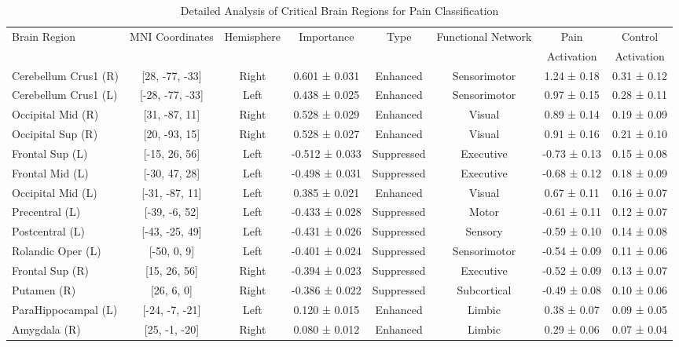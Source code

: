 \documentclass[10pt,journal,compsoc]{IEEEtran}
\begin{document}
\begin{table}[htbp]
\caption{Detailed Analysis of Critical Brain Regions for Pain Classification}
\label{tab:detailed_brain_regions}
\centering
\small
\begin{tabular}{lccccccc}
\toprule
\multirow{2}{*}{Brain Region} & \multirow{2}{*}{MNI Coordinates} & \multirow{2}{*}{Hemisphere} & \multirow{2}{*}{Importance} & \multirow{2}{*}{Type} & \multirow{2}{*}{Functional Network} & Pain & Control \\
& & & & & & Activation & Activation \\
\midrule
Cerebellum Crus1 (R) & [28, -77, -33] & Right & 0.601 ± 0.031 & Enhanced & Sensorimotor & 1.24 ± 0.18 & 0.31 ± 0.12 \\
Cerebellum Crus1 (L) & [-28, -77, -33] & Left & 0.438 ± 0.025 & Enhanced & Sensorimotor & 0.97 ± 0.15 & 0.28 ± 0.11 \\
Occipital Mid (R) & [31, -87, 11] & Right & 0.528 ± 0.029 & Enhanced & Visual & 0.89 ± 0.14 & 0.19 ± 0.09 \\
Occipital Sup (R) & [20, -93, 15] & Right & 0.528 ± 0.027 & Enhanced & Visual & 0.91 ± 0.16 & 0.21 ± 0.10 \\
Frontal Sup (L) & [-15, 26, 56] & Left & -0.512 ± 0.033 & Suppressed & Executive & -0.73 ± 0.13 & 0.15 ± 0.08 \\
Frontal Mid (L) & [-30, 47, 28] & Left & -0.498 ± 0.031 & Suppressed & Executive & -0.68 ± 0.12 & 0.18 ± 0.09 \\
Occipital Mid (L) & [-31, -87, 11] & Left & 0.385 ± 0.021 & Enhanced & Visual & 0.67 ± 0.11 & 0.16 ± 0.07 \\
Precentral (L) & [-39, -6, 52] & Left & -0.433 ± 0.028 & Suppressed & Motor & -0.61 ± 0.11 & 0.12 ± 0.07 \\
Postcentral (L) & [-43, -25, 49] & Left & -0.431 ± 0.026 & Suppressed & Sensory & -0.59 ± 0.10 & 0.14 ± 0.08 \\
Rolandic Oper (L) & [-50, 0, 9] & Left & -0.401 ± 0.024 & Suppressed & Sensorimotor & -0.54 ± 0.09 & 0.11 ± 0.06 \\
Frontal Sup (R) & [15, 26, 56] & Right & -0.394 ± 0.023 & Suppressed & Executive & -0.52 ± 0.09 & 0.13 ± 0.07 \\
Putamen (R) & [26, 6, 0] & Right & -0.386 ± 0.022 & Suppressed & Subcortical & -0.49 ± 0.08 & 0.10 ± 0.06 \\
ParaHippocampal (L) & [-24, -7, -21] & Left & 0.120 ± 0.015 & Enhanced & Limbic & 0.38 ± 0.07 & 0.09 ± 0.05 \\
Amygdala (R) & [25, -1, -20] & Right & 0.080 ± 0.012 & Enhanced & Limbic & 0.29 ± 0.06 & 0.07 ± 0.04 \\
\bottomrule
\end{tabular}
\end{table}
\end{document}
